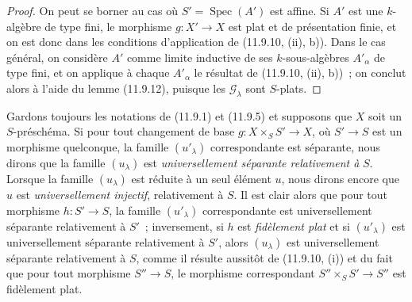 \begin{proof}
On peut se borner au cas où $S'=\operatorname{Spec}(A')$ est affine. Si $A'$
est une $k$-algèbre de type fini, le morphisme $g:X'\to X$ est plat et de
présentation finie, et on est donc dans les conditions d'application de
(11.9.10, (ii), b)). Dans le cas général, on considère $A'$ comme limite
inductive de ses $k$-sous-algèbres $A'_\alpha$ de type fini, et on applique à
chaque $A'_\alpha$ le résultat de (11.9.10, (ii), b))~; on conclut alors à
l'aide du lemme (11.9.12), puisque les $\mathcal G_\lambda$ sont $S$-plats.
\end{proof}

\begin{env}[11.9.14]
\label{IV.11.9.14-fr}
Gardons toujours les notations de (11.9.1) et (11.9.5) et supposons que $X$
soit un $S$-préschéma. Si pour tout changement de base
$g:X\times_S S'\to X$, où $S'\to S$ est un morphisme quelconque, la famille
$(u'_\lambda)$ correspondante est séparante, nous dirons que la famille
$(u_\lambda)$ est \emph{universellement séparante relativement à} $S$.
Lorsque la famille $(u_\lambda)$ est réduite à un seul élément $u$, nous
dirons encore que $u$ est \emph{universellement injectif}, relativement à
$S$. Il est clair alors que pour tout morphisme $h:S'\to S$, la famille
$(u'_\lambda)$ correspondante est universellement séparante relativement à
$S'$~; inversement, si $h$ est \emph{fidèlement plat} et si $(u'_\lambda)$ est
universellement séparante relativement à $S'$, alors $(u_\lambda)$ est
universellement séparante relativement à $S$, comme il résulte aussitôt de
(11.9.10, (i)) et du fait que pour tout morphisme $S''\to S$, le morphisme
correspondant $S''\times_S S'\to S''$ est fidèlement plat.
\end{env}

